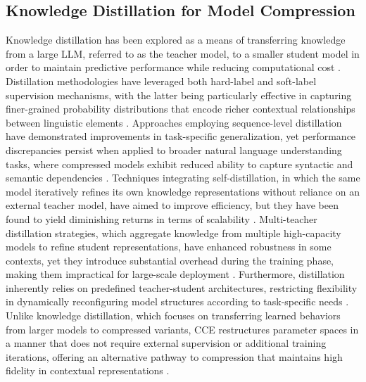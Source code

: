 \documentclass{article}
\begin{document}
\subsection{Knowledge Distillation for Model Compression}
Knowledge distillation has been explored as a means of transferring knowledge from a large LLM, referred to as the teacher model, to a smaller student model in order to maintain predictive performance while reducing computational cost \cite{aturd2024dynamic}. Distillation methodologies have leveraged both hard-label and soft-label supervision mechanisms, with the latter being particularly effective in capturing finer-grained probability distributions that encode richer contextual relationships between linguistic elements \cite{sasaki2024enhancing}. Approaches employing sequence-level distillation have demonstrated improvements in task-specific generalization, yet performance discrepancies persist when applied to broader natural language understanding tasks, where compressed models exhibit reduced ability to capture syntactic and semantic dependencies \cite{lococ2024token}. Techniques integrating self-distillation, in which the same model iteratively refines its own knowledge representations without reliance on an external teacher model, have aimed to improve efficiency, but they have been found to yield diminishing returns in terms of scalability \cite{ arsal2024emerging}. Multi-teacher distillation strategies, which aggregate knowledge from multiple high-capacity models to refine student representations, have enhanced robustness in some contexts, yet they introduce substantial overhead during the training phase, making them impractical for large-scale deployment \cite{xiong2024integrating}. Furthermore, distillation inherently relies on predefined teacher-student architectures, restricting flexibility in dynamically reconfiguring model structures according to task-specific needs \cite{keith2024optimizing}. Unlike knowledge distillation, which focuses on transferring learned behaviors from larger models to compressed variants, CCE restructures parameter spaces in a manner that does not require external supervision or additional training iterations, offering an alternative pathway to compression that maintains high fidelity in contextual representations \cite{lesatod2024adaptive}. 
\end{document}
